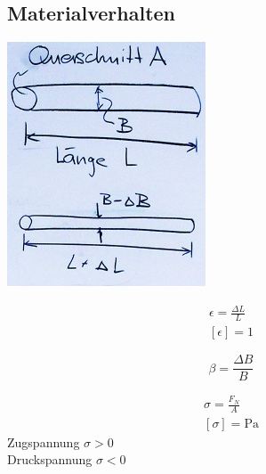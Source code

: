 \subsection{Materialverhalten}
\includegraphics{Bild41} \\
\begin{def*}[ note = Dehnung , index = Dehnung ]
	\begin{gather*}
		\epsilon = \frac{\Delta L}{L} \\
		[ \epsilon ] = 1
	\end{gather*}
\end{def*}
\begin{def*}[ note = Querkontraktion , index = Querkontraktion ]
	\[ \beta = \frac{\Delta B}{B} \]
\end{def*}
\begin{def*}[ note = Normalspannung , index = Normalspannung ]
	\begin{gather*}
		\sigma = \frac{F_N}{A} \\
		[ \sigma ] = \text{Pa}
	\end{gather*}
	Zugspannung $\sigma > 0$ \\
	Druckspannung $\sigma < 0$
\end{def*}


